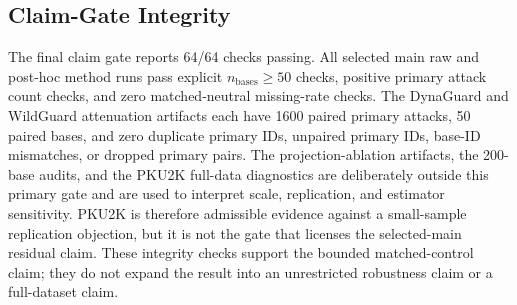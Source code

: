 \subsection{Claim-Gate Integrity}

The final claim gate reports 64/64 checks passing. All selected main raw and post-hoc method runs pass explicit $n_{\mathrm{bases}} \ge 50$ checks, positive primary attack count checks, and zero matched-neutral missing-rate checks. The DynaGuard and WildGuard attenuation artifacts each have 1600 paired primary attacks, 50 paired bases, and zero duplicate primary IDs, unpaired primary IDs, base-ID mismatches, or dropped primary pairs. The projection-ablation artifacts, the 200-base audits, and the PKU2K full-data diagnostics are deliberately outside this primary gate and are used to interpret scale, replication, and estimator sensitivity. PKU2K is therefore admissible evidence against a small-sample replication objection, but it is not the gate that licenses the selected-main residual claim. These integrity checks support the bounded matched-control claim; they do not expand the result into an unrestricted robustness claim or a full-dataset claim.
